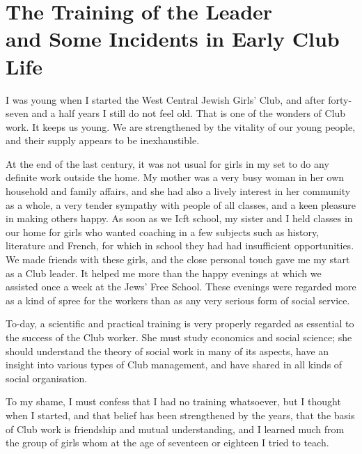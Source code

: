 \chapter[The Training of the Leader and Some Incidents in Early Club Life][The Training of the Leader]{The Training of the Leader\\and Some Incidents in Early Club Life}

I was young when I started the West Central Jewish
Girls’ Club, and after forty-seven and a half years I still
do not feel old. That is one of the wonders of Club work.
It keeps us young. We are strengthened by the vitality of
our young people, and their supply appears to be
inexhaustible.

At the end of the last century, it was not usual for girls
in my set to do any definite work outside the home. My
mother was a very busy woman in her own household and
family affairs, and she had also a lively interest in her
community as a whole, a very tender sympathy with
people of all classes, and a keen pleasure in making others
happy. As soon as we Icft school, my sister and I held
classes in our home for girls who wanted coaching in a
few subjects such as history, literature and French, for
which in school they had had insufficient opportunities.
We made friends with these girls, and the close personal
touch gave me my start as a Club leader. It helped me
more than the happy evenings at which we assisted once
a week at the Jews’ Free School. These evenings were
regarded more as a kind of spree for the workers than
as any very serious form of social service.

To-day, a scientific and practical training is very
properly regarded as essential to the success of the Club
worker. She must study economics and social science;
she should understand the theory of social work in many
of its aspects, have an insight into various types of Club
management, and have shared in all kinds of social
organisation.

To my shame, I must confess that I had no training
whatsoever, but I thought when I started, and that belief
has been strengthened by the years, that the basis of
Club work is friendship and mutual understanding, and I
learned much from the group of girls whom at the age
of seventeen or eighteen I tried to teach.

